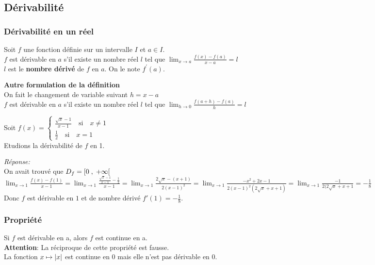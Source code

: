 \begin{example}
\subsection{Dérivabilité}
\subsubsection*{Dérivabilité en un réel}
\begin{definition}
Soit $ f $ une fonction définie sur un intervalle $ I$ et $a\in I $.\\
$ f $ est dérivable en $ a $ s'il existe un nombre réel $ l $ tel que $ \displaystyle\lim_{x \to a} \frac{f(x)-f(a)}{x-a}=l $ \\
$ l $ est le  \textbf{nombre dérivé} de $ f $ en $ a. $ On le note             $f^{'}(a)$.
\end{definition}

\textbf{Autre formulation de la définition}\\
On fait le changement de variable suivant $ h=x-a $ \\
$ f $ est dérivable en $ a $ s'il existe un nombre réel $ l $ tel que $\displaystyle \lim_{h \to 0} \frac{f(a+h)-f(a)}{h}=l $ 

\begin{example}
Soit $ f (x)=\left\{\begin{array}{l} \frac{\sqrt{x}-1}{x-1}\quad \textrm{si} \quad x\neq 1 \\ \frac{1}{2}\quad \textrm{si}\quad x= 1  \end{array} \right.$\\
Etudions  la dérivabilité  de $ f $ en 1.
\end{example}
\textsl{Réponse:}\\
On avait trouvé que $D_{f}=\left[0 \;,\; +\infty\right[  $ \\
$\displaystyle \lim_{x \to 1 } \frac{f(x)-f(1)}{x-1}=\displaystyle \lim_{x \to 1 }\frac{\frac{\sqrt{x}-1}{x-1}-\frac{1}{2}}{x-1}= \lim_{x \to 1 }\frac{2\sqrt{x}-(x+1)}{2(x-1)^{2}}=\lim_{x \to 1 } \frac{-x^{2}+2x-1}{2(x-1)^{2}(2\sqrt{x}+x+1)}=\displaystyle \lim_{x \to 1 }\frac{-1}{2(2\sqrt{x}+x+1}=-\frac{1}{8}$  \\ Donc $ f $ est dérivable en $ 1 $ et de nombre dérivé $ f'(1)= -\frac{1}{8}$.
\subsubsection*{Propriété}
\begin{property}
Si $ f $ est dérivable en a, alors $ f $ est continue en a.\\
\textbf{Attention}: La réciproque de cette propriété est fausse.\\
La fonction $ x\mapsto \left\lvert x \right\rvert $ est continue en 0 mais elle n'est pas dérivable en $ 0 $.
\end{property}

\end{example}
